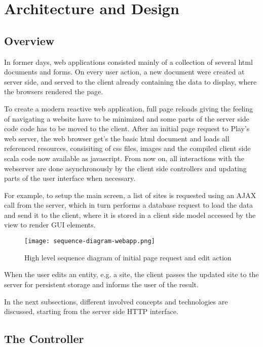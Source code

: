 \section{Architecture and Design}

\subsection{Overview}


In former days, web applications consisted mainly of a collection of several html documents and forms. On every user action, a new document were created at server side, and served to the client already containing the data to display, where the browsers rendered the page.

To create a modern reactive web application, full page reloads giving the feeling of navigating a website have to be minimized and some parts of the server side code code has to be moved to the client. 
After an initial page request to Play's web server, the web browser get's the basic html document and loads all referenced resources, consisiting of css files, images and the compiled client side scala code now available as javascript. From now on, all interactions with the webserver are done asynchronously by the client side controllers and updating parts of the user interface when necessary.

For example, to setup the main screen, a list of sites is requested using an AJAX call from the server, which in turn performs a database request to load the data and send it to the client, where it is stored in a client side model accessed by the view to render GUI elements.

\begin{figure}[H]
\centering
\texttt{[image: sequence-diagram-webapp.png]}
\caption{High level sequence diagram of initial page request and edit action}
\end{figure}

When the user edits an entity, e.g. a site, the client passes the updated site to the server for persistent storage and informs the user of the result.

In the next subsections, different involved concepts and technologies are discussed, starting from the server side HTTP interface.

\subsection{The Controller}

